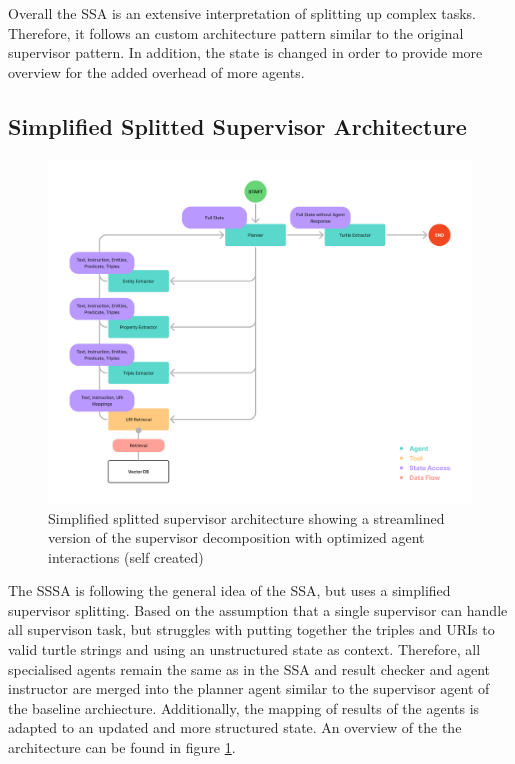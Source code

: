 \documentclass[a4paper,oneside,bibliography=totoc]{scrbook}
\begin{document}
Overall the \ac{SSA} is an extensive interpretation of splitting up complex tasks. Therefore, it follows an custom architecture pattern similar to the original supervisor pattern. In addition, the state is changed in order to provide more overview for the added overhead of more agents.

\subsection{Simplified Splitted Supervisor Architecture}
\label{subsec:simplified_splitted_supervisor}
\begin{figure}[h]
  \centering
  \includegraphics[width=\textwidth]{figures/Simplified Splitted Supervisor Architecture.png}
  \caption{Simplified splitted supervisor architecture showing a streamlined version of the supervisor decomposition with optimized agent interactions (self created)}
  \label{fig:simplified_splitted_supervisor_architecture}
\end{figure}

The \ac{SSSA} is following the general idea of the \ac{SSA}, but uses a simplified supervisor splitting. Based on the assumption that a single supervisor can handle all supervison task, but struggles with putting together the triples and URIs to valid turtle strings and using an unstructured state as context. Therefore, all specialised agents remain the same as in the \ac{SSA} and result checker and agent instructor are merged into the planner agent similar to the supervisor agent of the baseline archiecture. Additionally, the mapping of results of the agents is adapted to an updated and more structured state. An overview of the the architecture can be found in figure \ref{fig:simplified_splitted_supervisor_architecture}.
\end{document}
